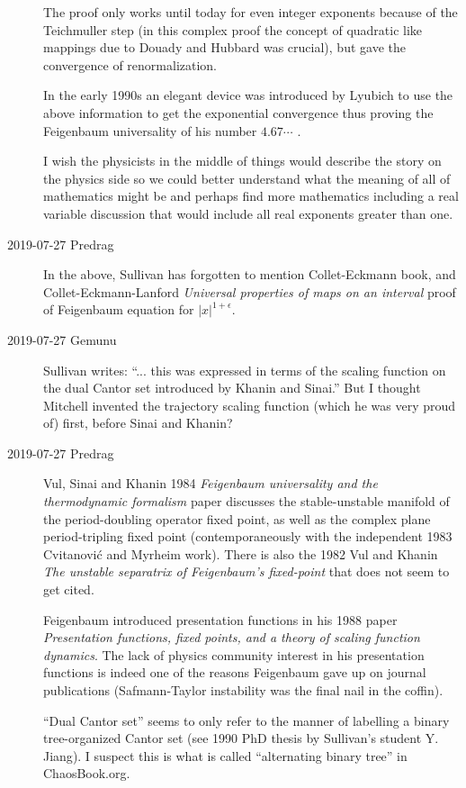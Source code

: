 \begin{description}
The proof only works until today for even integer exponents because of
the Teichmuller step (in this complex proof the concept of quadratic like
mappings due to Douady and Hubbard was crucial), but gave the convergence
of renormalization.

In the early 1990s an elegant device was introduced by Lyubich to use the
above information to get the exponential convergence thus proving the
Feigenbaum universality of his number $4.67\cdots$ .

I wish the physicists in the middle of things would describe the story on
the physics side so we could better understand what the meaning of all of
mathematics might be and perhaps find more mathematics including a real
variable discussion that would include all real exponents greater than
one.

\item[2019-07-27 Predrag]
In the above, Sullivan has forgotten to mention Collet-Eckmann
book, and Collet-Eckmann-Lanford {\em
Universal properties of maps on an interval} proof of Feigenbaum
equation for $|x|^{1+\epsilon}$.

\item[2019-07-27 Gemunu]
Sullivan writes: ``... this was expressed in terms of the scaling
function on the dual Cantor set introduced by Khanin and Sinai.'' But I
thought Mitchell invented the trajectory scaling function (which he was
very proud of) first, before Sinai and Khanin?

\item[2019-07-27 Predrag]
Vul, Sinai and Khanin 1984 {\em Feigenbaum universality and
the thermodynamic formalism} paper discusses the stable-unstable manifold
of the period-doubling operator fixed point, as well as the complex plane
period-tripling fixed point (contemporaneously with the independent 1983
Cvitanovi{\'c} and Myrheim work). There is also the
1982 Vul and Khanin {\em The unstable separatrix of
{Feigenbaum}'s fixed-point} that does not seem to get cited.

Feigenbaum introduced presentation functions in his 1988
paper {\em Presentation functions, fixed points, and a
theory of scaling function dynamics}. The lack of physics community
interest in his presentation functions is indeed one of the reasons
Feigenbaum gave up on journal publications
(Safmann-Taylor instability was the final nail in the
coffin).

``Dual Cantor set'' {seems to only} refer to the manner of labelling a
binary tree-organized Cantor set (see 1990 PhD thesis by Sullivan's
student
{Y. Jiang}). I suspect this is what is called ``alternating  binary
tree'' in
{ChaosBook.org}.


\end{description}
